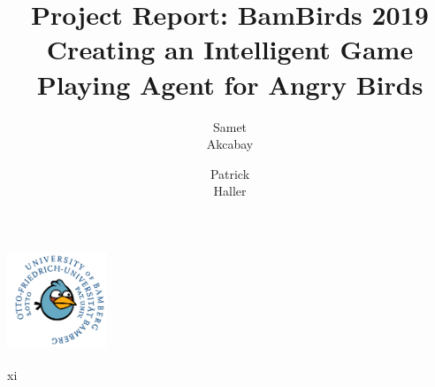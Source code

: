 \documentclass[11pt]{article}
\begin{document}
	\begin{titlepage}
		\begin{center}
			\title{Project Report: BamBirds 2019\\
				{\small Creating  an Intelligent Game Playing Agent for Angry Birds}}
			\includegraphics[width=3cm,height=3cm]{img/logo.png}
			\author{Samet\\Akcabay\and
			Patrick\\Haller}
		\end{center}
	\end{titlepage}
\maketitle
\newpage
\tableofcontents
\newpage
xi







\end{document}
